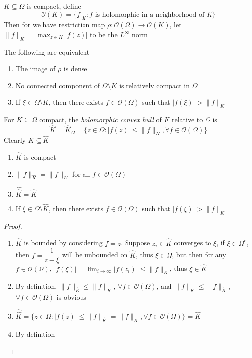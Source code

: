 \documentclass[../main.tex]{subfiles}
\begin{document}
\begin{definition}
$K\subseteq\Omega$ is compact, define
\[\mathcal O(K)=\{f|_K:f\text{ is holomorphic in a neighborhood of }K\}\]
Then for we have restriction map $\rho:\mathcal O(\Omega)\to \mathcal O(K)$, let $\|f\|_K=\displaystyle\max_{z\in K}|f(z)|$ to be the $L^\infty$ norm
\end{definition}

\begin{theorem}\label{Runge's theorem}
The following are equivalent
\begin{enumerate}
\item The image of $\rho$ is dense
\item No connected component of $\Omega\setminus K$ is relatively compact in $\Omega$
\item If $\xi\in \Omega\setminus K$, then there exists $f\in \mathcal O(\Omega)$ such that $|f(\xi)|>\|f\|_K$
\end{enumerate}
\end{theorem}

\begin{definition}
For $K\subseteq\Omega$ compact, the \textit{holomorphic convex hull} of $K$ relative to $\Omega$ is
\[\hat K=\hat K_\Omega=\{z\in\Omega:|f(z)|\leq \|f\|_K,\forall f\in \mathcal O(\Omega)\}\]
Clearly $K\subseteq \hat K$
\end{definition}

\begin{proposition}\hfill
\begin{enumerate}
\item $\hat K$ is compact
\item $\|f\|_{\hat K}=\|f\|_K$ for all $f\in \mathcal O(\Omega)$
\item $\hat{\hat K}=\hat K$
\item If $\xi\in\Omega\setminus\hat K$, then there exists $f\in \mathcal O(\Omega)$ such that $|f(\xi)|>\|f\|_K$
\end{enumerate}
\end{proposition}

\begin{proof}
\begin{enumerate}
\item $\hat K$ is bounded by considering $f=z$. Suppose $z_i\in\hat K$ converges to $\xi$, if $\xi\in\Omega^c$, then $f=\dfrac{1}{z-\xi}$ will be unbounded on $\hat K$, thus $\xi\in\Omega$, but then for any $f\in\mathcal O(\Omega)$, $\displaystyle|f(\xi)|=\lim_{i\to\infty}|f(z_i)|\leq\|f\|_K$, thus $\xi\in\hat K$
\item By definition, $\|f\|_{\hat K}\leq \|f\|_K$, $\forall f\in \mathcal O(\Omega)$, and $\|f\|_K\leq\|f\|_{\hat K}$, $\forall f\in \mathcal O(\Omega)$ is obvious
\item $\hat{\hat K}=\{z\in\Omega:|f(z)|\leq \|f\|_{\hat K}=\|f\|_{K},\forall f\in \mathcal O(\Omega)\}=\hat K$
\item By definition
\end{enumerate}
\end{proof}
\end{document}
